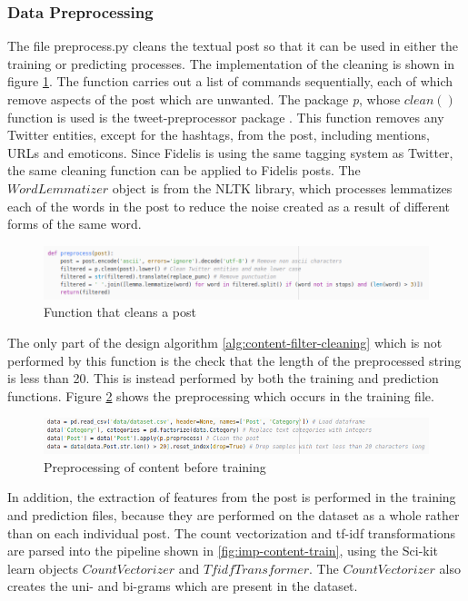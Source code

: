 \subsubsection{Data Preprocessing}
The file preprocess.py cleans the textual post so that it can be used in either the training or predicting processes. The implementation of the cleaning is shown in figure \ref{fig:content-clean}. The function carries out a list of commands sequentially, each of which remove aspects of the post which are unwanted. The package \textit{p}, whose $clean()$ function is used is the tweet-preprocessor package \cite{TweetPreprocessor}. This function removes any Twitter entities, except for the hashtags, from the post, including mentions, URLs and emoticons. Since Fidelis is using the same tagging system as Twitter, the same cleaning function can be applied to Fidelis posts. The $WordLemmatizer$ object is from the NLTK library, which processes lemmatizes each of the words in the post to reduce the noise created as a result of different forms of the same word. 

\begin{figure}[H]
\centering
\includegraphics[width=\textwidth]{Images/Implementation/content-clean}
\caption{Function that cleans a post}
\label{fig:content-clean}
\end{figure}

The only part of the design algorithm \ref{alg:content-filter-cleaning} which is not performed by this function is the check that the length of the preprocessed string is less than 20. This is instead performed by both the training and prediction functions. Figure \ref{fig:content-preprocess} shows the preprocessing which occurs in the training file.

\begin{figure}[H]
\centering
\includegraphics[width=\textwidth]{Images/Implementation/content-preprocess}
\caption{Preprocessing of content before training}
\label{fig:content-preprocess}
\end{figure}

In addition, the extraction of features from the post is performed in the training and prediction files, because they are performed on the dataset as a whole rather than on each individual post. The count vectorization and tf-idf transformations are parsed into the pipeline shown in \ref{fig:imp-content-train}, using the Sci-kit learn objects $CountVectorizer$ and $TfidfTransformer$. The $CountVectorizer$ also creates the uni- and bi-grams which are present in the dataset.

